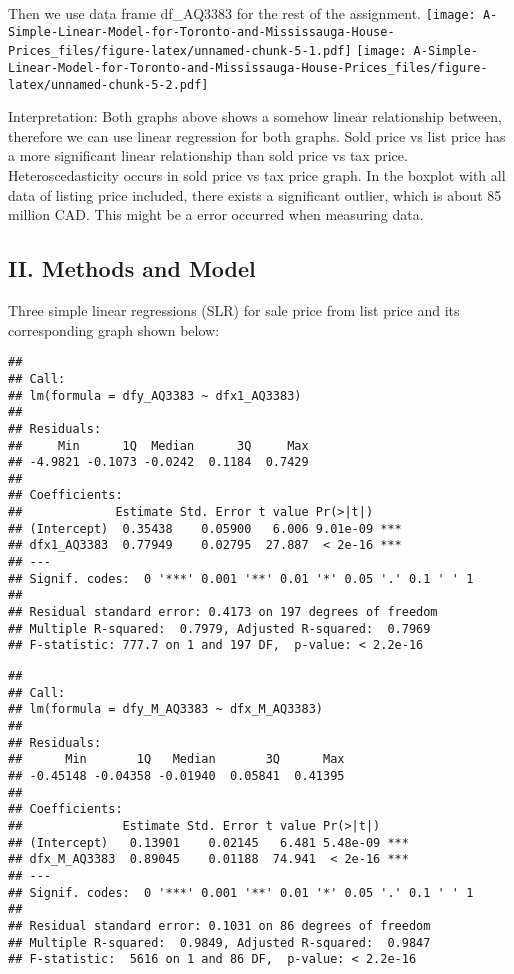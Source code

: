 \documentclass[
]{article}
\begin{document}
Then we use data frame df\_AQ3383 for the rest of the assignment.
\texttt{[image: A-Simple-Linear-Model-for-Toronto-and-Mississauga-House-Prices\_files/figure-latex/unnamed-chunk-5-1.pdf]}
\texttt{[image: A-Simple-Linear-Model-for-Toronto-and-Mississauga-House-Prices\_files/figure-latex/unnamed-chunk-5-2.pdf]}

Interpretation: Both graphs above shows a somehow linear relationship
between, therefore we can use linear regression for both graphs. Sold
price vs list price has a more significant linear relationship than sold
price vs tax price. Heteroscedasticity occurs in sold price vs tax price
graph. In the boxplot with all data of listing price included, there
exists a significant outlier, which is about 85 million CAD. This might
be a error occurred when measuring data.

\hypertarget{ii.-methods-and-model}{%
\subsection{II. Methods and Model}\label{ii.-methods-and-model}}

Three simple linear regressions (SLR) for sale price from list price and
its corresponding graph shown below:

\begin{verbatim}
## 
## Call:
## lm(formula = dfy_AQ3383 ~ dfx1_AQ3383)
## 
## Residuals:
##     Min      1Q  Median      3Q     Max 
## -4.9821 -0.1073 -0.0242  0.1184  0.7429 
## 
## Coefficients:
##             Estimate Std. Error t value Pr(>|t|)    
## (Intercept)  0.35438    0.05900   6.006 9.01e-09 ***
## dfx1_AQ3383  0.77949    0.02795  27.887  < 2e-16 ***
## ---
## Signif. codes:  0 '***' 0.001 '**' 0.01 '*' 0.05 '.' 0.1 ' ' 1
## 
## Residual standard error: 0.4173 on 197 degrees of freedom
## Multiple R-squared:  0.7979, Adjusted R-squared:  0.7969 
## F-statistic: 777.7 on 1 and 197 DF,  p-value: < 2.2e-16
\end{verbatim}

\begin{verbatim}
## 
## Call:
## lm(formula = dfy_M_AQ3383 ~ dfx_M_AQ3383)
## 
## Residuals:
##      Min       1Q   Median       3Q      Max 
## -0.45148 -0.04358 -0.01940  0.05841  0.41395 
## 
## Coefficients:
##              Estimate Std. Error t value Pr(>|t|)    
## (Intercept)   0.13901    0.02145   6.481 5.48e-09 ***
## dfx_M_AQ3383  0.89045    0.01188  74.941  < 2e-16 ***
## ---
## Signif. codes:  0 '***' 0.001 '**' 0.01 '*' 0.05 '.' 0.1 ' ' 1
## 
## Residual standard error: 0.1031 on 86 degrees of freedom
## Multiple R-squared:  0.9849, Adjusted R-squared:  0.9847 
## F-statistic:  5616 on 1 and 86 DF,  p-value: < 2.2e-16
\end{verbatim}
\end{document}
